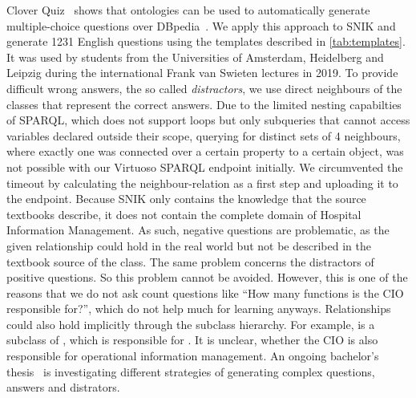 \documentclass{IOS-Book-Article}     %
\newcommand{\citep}{\cite}%
\begin{document}
Clover Quiz~\citep{cloverquiz} shows that ontologies can be used to automatically generate multiple-choice questions over DBpedia~\citep{dbpedia}.
We apply this approach to SNIK and generate 1231 English questions using the templates described in \cref{tab:templates}.
It was used by students from the Universities of Amsterdam, Heidelberg and Leipzig during the international Frank van Swieten lectures in 2019.
To provide difficult wrong answers, the so called \emph{distractors}, we use direct neighbours of the classes that represent the correct answers.
Due to the limited nesting capabilties of SPARQL, which does not support loops but only subqueries that cannot access variables declared outside their scope, querying for distinct sets of 4 neighbours, where exactly one was connected over a certain property to a certain object, was not possible with our Virtuoso SPARQL endpoint initially.
We circumvented the timeout by calculating the neighbour-relation as a first step and uploading it to the endpoint.
%
Because SNIK only contains the knowledge that the source textbooks describe, it does not contain the complete domain of Hospital Information Management.
As such, negative questions are problematic, as the given relationship could hold in the real world but not be described in the textbook source of the class.
The same problem concerns the distractors of positive questions.
So this problem cannot be avoided.
However, this is one of the reasons that we do not ask count questions like \enquote{How many functions is the CIO responsible for?}, which do not help much for learning anyways. %
Relationships could also hold implicitly through the subclass hierarchy.
For example,  is a subclass of , which is responsible for .
It is unclear, whether the CIO is also responsible for operational information management.
An ongoing bachelor's thesis~\citep{snikquiz} is investigating different strategies of generating complex questions, answers and distrators.





\iffalse
\end{document}
